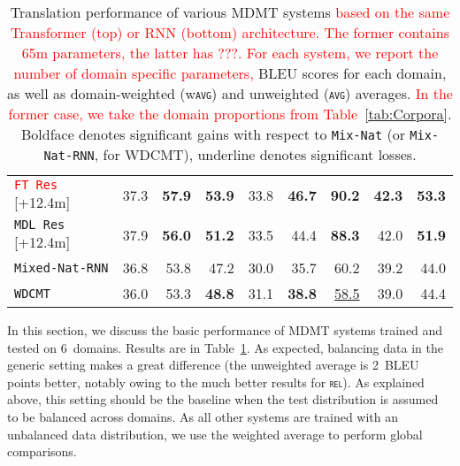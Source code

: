 \documentclass[11pt,a4paper]{article}
\newcommand{\fyTodo}[1]{\Todo[FY:]{\textcolor{orange}{#1}}}
\newcommand{\fyDone}[1]{\done[FY]\Todo[FY:]{\textcolor{orange}{#1}}}
\newcommand{\revision}[1]{\textcolor{red}{#1}}
\newcommand{\domain}[1]{\texttt{\textsc{#1}}}
\newcommand{\system}[1]{\texttt{{#1}}}
\newcommand{\SB}[1]{\textbf{#1}}
\newcommand{\SW}[1]{\underline{#1}}
\begin{document}
\begin{table*}
\begin{tabular}{|p{3cm}|*{8}{r|}}
    \revision{\system{FT Res}}   \hfill{\footnotesize[+12.4m]}  & 37.3 & \SB{57.9} & \SB{53.9} & 33.8 & \SB{46.7} & \SB{90.2}  & \SB{42.3} & \SB{53.3} \\ %
    \system{MDL Res} \hfill{\footnotesize[+12.4m]}    & 37.9 & \SB{56.0}  & \SB{51.2}   & 33.5   &  44.4  & \SB{88.3} & 42.0 & \SB{51.9} \\%
     \hline \hline
    \system{Mixed-Nat-RNN}  & 36.8 & 53.8 & 47.2 & 30.0 & 35.7 & 60.2  & 39.2  & 44.0 \\
    \hline
    \system{WDCMT}       & 36.0 & 53.3 & \SB{48.8} & 31.1 & \SB{38.8} & \SW{58.5} & 39.0 & 44.4 \\ %
    \hline
  \end{tabular}
  \caption{Translation performance of various MDMT systems \revision{based on the same Transformer (top) or RNN (bottom) architecture. The former contains 65m parameters, the latter has ???. For each system, we report the number of domain specific parameters,}  BLEU scores for each domain, as well as domain-weighted (w\domain{avg}) and unweighted (\domain{avg}) averages. \revision{In the former case, we take the domain proportions from Table~\ref{tab:Corpora}}. Boldface denotes significant gains with respect to \system{Mix-Nat} (or \system{Mix-Nat-RNN}, for WDCMT), underline denotes significant losses.}
  \label{tab:performance}
  \fyDone{Do we have significancy tests for averages?} %
\end{table*}


In this section, we discuss the basic performance of MDMT systems trained and tested on $6$~domains. Results are in Table~\ref{tab:performance}. As expected, balancing data in the generic setting makes a great difference (the unweighted average is 2~BLEU points\fyDone{BP?} better, notably owing to the much better results for \domain{rel}). As explained above, this setting should be the baseline when the test distribution is assumed to be balanced across domains. As all other systems are trained with an unbalanced data distribution, we use the weighted average to perform global comparisons.
\end{document}
